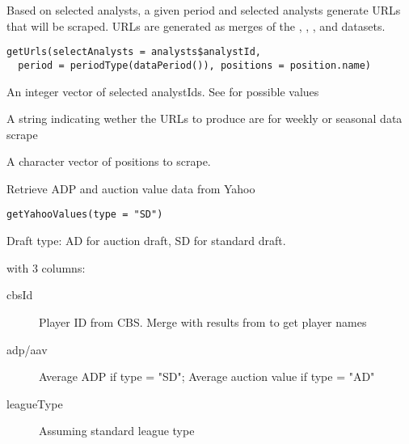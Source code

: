 \documentclass[a4paper]{book}
\begin{document}
%
\begin{Description}\relax
Based on selected analysts, a given period and selected analysts generate
URLs that will be scraped. URLs are generated as merges of the ,
, , and  datasets.
\end{Description}
%
\begin{Usage}
\begin{verbatim}
getUrls(selectAnalysts = analysts$analystId,
  period = periodType(dataPeriod()), positions = position.name)
\end{verbatim}
\end{Usage}
%
\begin{Arguments}
\begin{ldescription}
\item[\code{selectAnalysts}] An integer vector of selected analystIds.
See  for possible values

\item[\code{period}] A string indicating wether the URLs to produce are for weekly
or seasonal data scrape

\item[\code{positions}] A character vector of positions to scrape.
\end{ldescription}
\end{Arguments}
%
\begin{Description}\relax
Retrieve ADP and auction value data from Yahoo
\end{Description}
%
\begin{Usage}
\begin{verbatim}
getYahooValues(type = "SD")
\end{verbatim}
\end{Usage}
%
\begin{Arguments}
\begin{ldescription}
\item[\code{type}] Draft type: AD for auction draft, SD for standard draft.
\end{ldescription}
\end{Arguments}
%
\begin{Value}
 with 3 columns:
\begin{description}

\item[cbsId] Player ID from CBS. Merge with results from 
to get player names
\item[adp/aav] Average ADP if type = "SD"; Average auction value if type = "AD"
\item[leagueType] Assuming standard league type
\end{description}

\end{Value}
\end{document}
